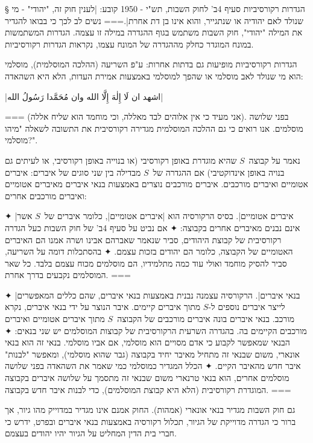 § הגדרות רקורסיביות
סעיף 4ב' לחוק השבות, תש"י - 1950 קובע:
\ע|לענין חוק זה, "יהודי" - מי שנולד לאם יהודיה או שנתגייר, והוא אינו בן
דת אחרת|.===
נשים לב לכך כי בבואו להגדיר את המילה "יהודי", חוק השבות משתמש בגוף ההגדרה במילה
זו עצמה. הגדרות המשתמשות במונח המוגדר כחלק מההגדרה של המונח עצמו, נקראות הגדרות
רקורסיביות.

הגדרות רקורסיביות מופיעות גם בדתות אחרות: ע"פ השריעה (ההלכה המוסלמית), מוסלמי
הוא מי שנולד לאב מוסלמי או שהפך למוסלמי באמצעות אמירת העדות, הלא היא השהאדה:
\begin{Arabic}
  \ע|اشهد ان لَا إِلٰهَ إِلَّا الله وان مُحَمَّدا رَسُولُ الله|
\end{Arabic}
===
(אני מעיד כי אין אלוהים לבד מאללה, וכי מוחמד הוא שליח אללה). בפני שלושה
מוסלמים. אנו רואים כי גם ההלכה המוסלמית מגדירה רקורסיבית את התשובה לשאלה "מיהו
מוסלמי?".

נאמר על קבוצה~$S$ שהיא מוגדרת באופן רקורסיבי (או בנוייה באופן רקורסיבי, או
לעיתים גם בנויה באופן אינדוקטיבי) אם ההגדרה של~$S$ מבדילה בין שני סוגים של
איברים: איברים אטומיים ואיברים מורכבים.
איברים מורכבים נוצרים באמצעות בנאי איברים מאיברים אטומיים ואיברים מורכבים
אחרים:
\begin{itemize}
  ✦ \ע|איברים אטומיים|. בסיס הרקורסיה הוא \ע|איברים אטומיים|, כלומר איברים
  של~$S$ אשר אינם נבנים מאיברים אחרים בקבוצה:
✦ אם נביט על סעיף 4ב' של חוק השבות כעל הגדרה רקורסיבית של קבוצת היהודים, סביר
שנאמר שאברהם אבינו ושרה
אמנו הם האיברים האטומיים של הקבוצה, כלומר הם יהודים בזכות עצמם.
✦ בהסתכלות דומה על השריעה, סביר להסיק מוחמד ואולי עוד כמה מתלמידיו, הם מוסלמים
מכוח עצמם בלבד.  כל שאר המוסלמים נקבעים בדרך אחרת.
===

✦ \ע|בנאי איברים|. הרקורסיה עצמנה נבנית באמצעות בנאי איברים, שהם כללים
המאפשרים לייצר איברים נוספים ל-$S$ מתוך איברים קיימים. איבר הנוצר על ידי בנאי
איברים, נקרא מורכב. בנאי איברים בונה איברים מורכבים של הקבוצה~$S$ מתוך איברים
אטומיים ואיברים מורכבים הקיימים בה. בהגדרה השרעית הרקורסיבית של קבוצות
המוסלמים יש שני בנאים:
✦ הבנאי שמאפשר לקבוע כי אדם מסויים הוא מוסלמי, אם אביו מוסלמי. בנאי זה הוא בנאי
אונארי, משום שבנאי זה מתחיל מאיבר יחיד בקבוצה (גבר שהוא מוסלמי), ומאפשר
"לבנות" איבר חדש מהאיבר הקיים.
✦ הכלל המגדיר כמוסלמי כמי שאמר את השהאדה בפני שלושה מוסלמים אחרים, הוא בנאי
טרנארי משום שבנאי זה מתסמך על שלושה איברים בקבוצה המוגדרת רקורסיבית (הלא היא
קבוצת המוסלמים), כדי לבנות איבר חדש בקבוצה.
===

גם חוק השבות מגדיר בנאי אונארי (אמהות). החוק אמנם אינו מגדיר
במדוייק מהו גיור, אך ברור כי הגדרה מדוייקת של הגיור, תכלול רקורסיה באמצעות בנאי
איברים ובפרט, ידרש כי חברי בית הדין המחליט על הגיור יהיו יהודים בעצמם.
\end{itemize}

